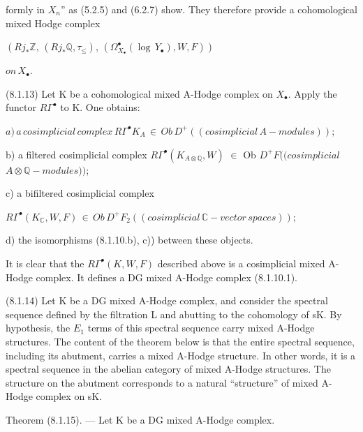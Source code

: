\documentclass[11pt,twoside]{article}
\newcommand{\DFormula}[1]{%
  \par\smallskip\noindent\hspace*{0pt}\(\displaystyle #1\)\par\smallskip
}
\begin{document}
formly in \(X_{n}\)” as (5.2.5) and (6.2.7) show. They therefore provide a cohomological mixed Hodge complex\par
\par\medskip
\DFormula{(Rj_{\ast }\mathbb{Z},\,(Rj_{\ast }\mathbb{Q},\tau _{\leq }),\,(\Omega _{X_{\bullet }}^{\bullet }(\operatorname{log}\,Y_{\bullet }),W,F))}
\par\medskip
\DFormula{on\,X_{\bullet }.}
\par\medskip
(8.1.13) Let K be a cohomological mixed A-Hodge complex on \(X_{\bullet }\). Apply the functor \(R\Gamma ^{\bullet }\) to K. One obtains:\par
\par\medskip
\DFormula{a)\,a\,cosimplicial\,complex\,R\Gamma ^{\bullet }K_{A}\,\in \,Ob\,D^{+}((cosimplicial\,A-modules));}
\par\medskip
b) a filtered cosimplicial complex \(R\Gamma ^{\bullet }(K_{A\otimes \mathbb{Q}},W)\) \(\in \) Ob \(D^{+}F((cosimplicial\) \(A\otimes \mathbb{Q}-modules))\);\par
\par\medskip
c) a bifiltered cosimplicial complex\par
\par\medskip
\DFormula{R\Gamma ^{\bullet }(K_{\mathbb{C}},W,F)\,\in \,Ob\,D^{+}F_{2}((cosimplicial\,\mathbb{C}-vector\,spaces));}
\par\medskip
d) the isomorphisms (8.1.10.b), c)) between these objects.\par
\par\medskip
It is clear that the \(R\Gamma ^{\bullet }(K,W,F)\) described above is a cosimplicial mixed A-Hodge complex. It defines a DG mixed A-Hodge complex (8.1.10.1).\par
\par\medskip
(8.1.14) Let K be a DG mixed A-Hodge complex, and consider the spectral sequence defined by the filtration L and abutting to the cohomology of sK. By hypothesis, the \(E_{1}\) terms of this spectral sequence carry mixed A-Hodge structures. The content of the theorem below is that the entire spectral sequence, including its abutment, carries a mixed A-Hodge structure. In other words, it is a spectral sequence in the abelian category of mixed A-Hodge structures. The structure on the abutment corresponds to a natural “structure” of mixed A-Hodge complex on sK.\par
\par\medskip
Theorem (8.1.15). — Let K be a DG mixed A-Hodge complex.\par
\end{document}
